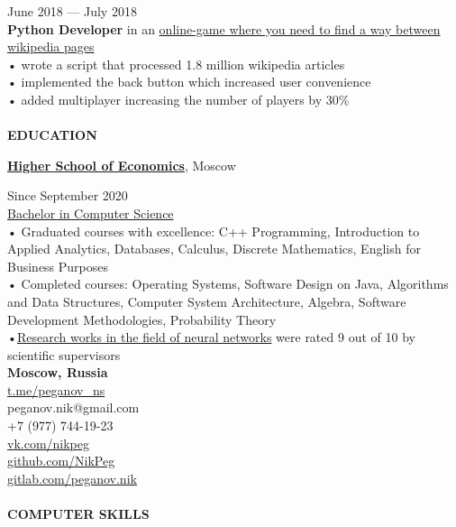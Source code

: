 \documentclass{article}
\begin{document}
\begin{vwcol}[widths={0.8,0.2},
 sep=.8cm, justify=flush,rule=0pt,indent=1em]
\begin{Large}
\end{Large}
\hspace{85pt}June 2018 — July 2018\\
\textbf{Python Developer} in an \href{https://github.com/igoose1/wikirace}{online-game where you need to find a way between wikipedia pages}\\
• wrote a script that processed 1.8 million wikipedia articles\\
• implemented the back button which increased user convenience\\
• added multiplayer increasing the number of players by 30\%\\
\\
\noindent\textcolor[rgb]{0.1255,0.2902,0.7843}{\textbf{\Large{EDUCATION}}}\\
\begin{Large}
\textbf{\href{https://hse.ru/}{Higher School of Economics}}, Moscow
\end{Large}
\hspace{75pt}Since September 2020\\
\href{https://cs.hse.ru/}{Bachelor in Computer Science}\\
• Graduated courses with excellence: C++ Programming, Introduction to Applied Analytics, Databases, Calculus, Discrete Mathematics, English for Business Purposes\\
• Completed courses: Operating Systems, Software Design on Java, Algorithms and Data Structures, Computer System Architecture, Algebra, Software Development Methodologies, Probability Theory\\
•\href{https://github.com/NikPeg/synchronization-of-neuromorphic-networks-of-the-close-world-from-the-point-of-view-of-complexes} {Research works in the field of neural networks} were rated 9 out of 10 by scientific supervisors\\
\newpage
\noindent\textbf{Moscow, Russia}\\
\noindent\textcolor[rgb]{0.1255,0.2902,0.7843}{\href{https://t.me/peganov\_ns}{t.me/peganov\_ns}}\\
peganov.nik@gmail.com\\
+7 (977) 744-19-23\\
\href{https://vk.com/nikpeg}{vk.com/nikpeg}\\
\href{https://github.com/NikPeg}{github.com/NikPeg}\\
\href{https://gitlab.com/peganov.nik}{gitlab.com/peganov.nik}\\
\\
\noindent\textcolor[rgb]{0.1255,0.2902,0.7843}{\textbf{COMPUTER SKILLS}}\\

\end{vwcol}
\end{document}
